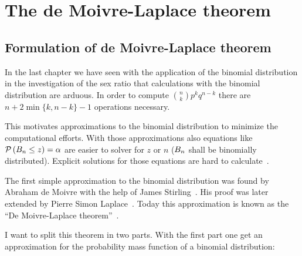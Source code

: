 \chapter{The de Moivre-Laplace theorem}

\section{Formulation of de Moivre-Laplace theorem}



In the last chapter we have seen with the application of the binomial distribution in the investigation of the sex ratio that calculations with the binomial distribution are arduous. In order to compute $\binom nk p^kq^{n-k}$ there are $n+2\min\{k,n-k\}-1$ operations necessary.

This motivates approximations to the binomial distribution to minimize the computational efforts. With those approximations also equations like $\mathcal P\left({B_{n} \le z}\right)=\alpha$ are easier to solver for $z$ or $n$ ($B_{n}$ shall be binomially distributed). Explicit solutions for those equations are hard to calculate~\cite[p. 469]{hald1}.

The first simple approximation to the binomial distribution was found by Abraham de Moivre with the help of James Stirling~\cite[p. 469]{hald1}. His proof was later extended by Pierre Simon Laplace~\cite[pp. 495 ff.]{hald1}. Today this approximation is known as the ``De Moivre-Laplace theorem''~\cite[pp. 64-67]{irle}.

I want to split this theorem in two parts. With the first part one get an approximation for the probability mass function of a binomial distribution:

